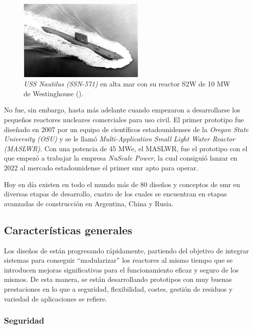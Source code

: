\begin{figure}[h]
    \centering
    \includegraphics[width=0.55\textwidth]{content/figures/nautilus.jpg}
    \caption{\emph{USS Nautilus (SSN-571)} en alta mar con su reactor S2W de 10 MW de Westinghouse (\cite{poder_naval}).}
    \label{fig:nautilus}
\end{figure}

No fue, sin embargo, hasta más adelante cuando empezaron a desarrollarse los pequeños reactores nucleares comerciales para uso civil. El primer prototipo fue diseñado en 2007 por un equipo de científicos estadounidenses de la \emph{Oregon State University (OSU)} y se le llamó \emph{Multi-Application Small Light Water Reactor (MASLWR)}. Con una potencia de 45 MWe, el MASLWR, fue el prototipo con el que empezó a trabajar la empresa \emph{NuScale Power}, la cual consiguió lanzar en 2022 al mercado estadounidense el primer \acrshort{smr} apto para operar.

Hoy en día existen en todo el mundo más de 80 diseños y conceptos de \acrshort{smr} en diversas etapas de desarrollo, cuatro de los cuales se encuentran en etapas avanzadas de construcción en Argentina, China y Rusia.

\subsection{Características generales}

Los diseños de  están progresando rápidamente, partiendo del objetivo de integrar sistemas para conseguir ``modularizar'' los reactores al mismo tiempo que se introducen mejoras significativas para el funcionamiento eficaz y seguro de los mismos. De esta manera, se están desarrollando prototipos con muy buenas prestaciones en lo que a seguridad, flexibilidad, costes, gestión de residuos y variedad de aplicaciones se refiere.

\subsubsection{Seguridad} \label{seguridad}

